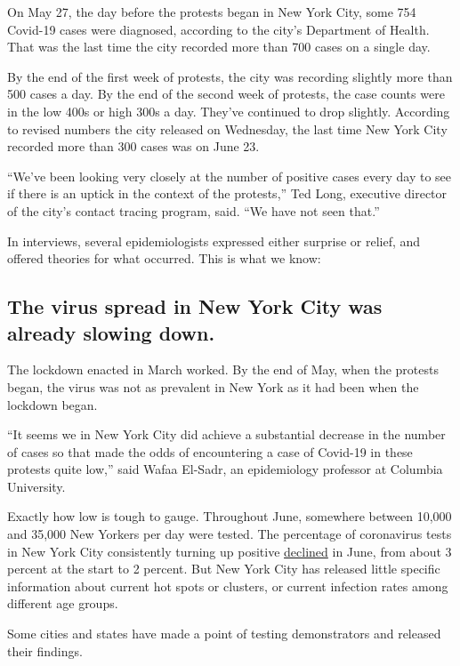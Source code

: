 On May 27, the day before the protests began in New York City, some 754
Covid-19 cases were diagnosed, according to the city's Department of
Health. That was the last time the city recorded more than 700 cases on
a single day.

By the end of the first week of protests, the city was recording
slightly more than 500 cases a day. By the end of the second week of
protests, the case counts were in the low 400s or high 300s a day.
They've continued to drop slightly. According to revised numbers the
city released on Wednesday, the last time New York City recorded more
than 300 cases was on June 23.

``We've been looking very closely at the number of positive cases every
day to see if there is an uptick in the context of the protests,'' Ted
Long, executive director of the city's contact tracing program, said.
``We have not seen that.''

In interviews, several epidemiologists expressed either surprise or
relief, and offered theories for what occurred. This is what we know:

\hypertarget{the-virus-spread-in-new-york-city-was-already-slowing-down}{%
\subsection{The virus spread in New York City was already slowing
down.}\label{the-virus-spread-in-new-york-city-was-already-slowing-down}}

The lockdown enacted in March worked. By the end of May, when the
protests began, the virus was not as prevalent in New York as it had
been when the lockdown began.

``It seems we in New York City did achieve a substantial decrease in the
number of cases so that made the odds of encountering a case of Covid-19
in these protests quite low,'' said Wafaa El-Sadr, an epidemiology
professor at Columbia University.

Exactly how low is tough to gauge. Throughout June, somewhere between
10,000 and 35,000 New Yorkers per day were tested. The percentage of
coronavirus tests in New York City consistently turning up positive
\href{https://www1.nyc.gov/site/doh/covid/covid-19-data.page}{declined}
in June, from about 3 percent at the start to 2 percent. But New York
City has released little specific information about current hot spots or
clusters, or current infection rates among different age groups.

Some cities and states have made a point of testing demonstrators and
released their findings.

